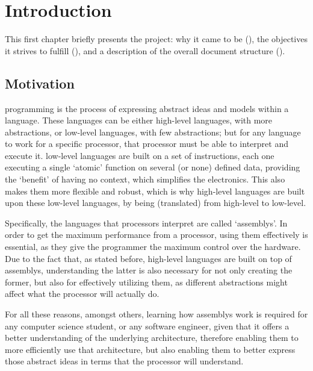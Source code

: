 \chapter{Introduction}\label{chap:introduction}
This first chapter briefly presents the project: why it came to be (), the objectives it strives to fulfill (), and a description of the overall document structure ().


\section{Motivation}\label{sec:motivation}
\Gls{programming} is the process of expressing abstract ideas and models within a language. These languages can be either \glspl{high-level language}, with more abstractions, or \glspl{low-level language}, with few abstractions; but for any language to work for a specific \gls{processor}, that \gls{processor} must be able to interpret and execute it. \Glspl{low-level language} are built on a set of instructions, each one executing a single `atomic' function on several (or none) defined data, providing the `benefit' of having no context, which simplifies the electronics. This also makes them more flexible and robust, which is why \glspl{high-level language} are built upon these \glspl{low-level language}, by being  (translated) from high-level to low-level.

Specifically, the languages that processors interpret  are called `\glspl{assembly}'. In order to get the maximum performance from a \gls{processor}, using them effectively is essential, as they give the \gls{programmer} the maximum control over the hardware. Due to the fact that, as stated before, \glspl{high-level language} are built on top of \glspl{assembly}, understanding the latter is also necessary for not only creating the former, but also for effectively utilizing them, as different abstractions might affect what the \gls{processor} will actually do.

For all these reasons, amongst others, learning how \glspl{assembly} work is required for any \gls{computer science} student, or any \gls{software engineer}, given that it offers a better understanding of the underlying architecture, therefore enabling them to more efficiently use that architecture, but also enabling them to better express those abstract ideas in terms that the \gls{processor} will understand.



